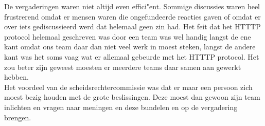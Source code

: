 \documentclass[eind]{penoverslag}
\begin{document}
De vergaderingen waren niet altijd even effici"ent. Sommige discussies waren heel frustrerend omdat er mensen waren die ongefundeerde reacties gaven of omdat er over iets gediscussieerd werd dat helemaal geen zin had. Het feit dat het HTTTP protocol helemaal geschreven was door een team was wel handig langst de ene kant omdat ons team daar dan niet veel werk in moest steken, langst de andere kant was het soms vaag wat er allemaal gebeurde met het HTTTP protocol. Het zou beter zijn geweest moesten er meerdere teams daar samen aan gewerkt hebben.  \\

 Het voordeel van de scheidsrechtercommissie was dat er maar een persoon zich moest bezig houden met de grote beslissingen. Deze moest dan gewoon zijn team inlichten en vragen naar meningen en deze bundelen en op de vergadering brengen. 
\end{document}
